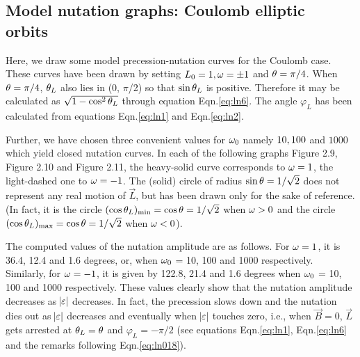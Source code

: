 \subsection{Model nutation graphs: Coulomb elliptic\\ orbits}
\begin{small}
Here, we draw some model precession-nutation  curves for 
the Coulomb case. These curves have been drawn by setting 
$L_{0} = 1, {\omega} = \pm 1$ and ${\theta} = \pi/4$. When ${\theta} = 
\pi/4$, ${\theta}_{L}$ also lies in (0, $\pi$/2) so that $\sin 
{\theta}_{L}$ is positive. Therefore it may be calculated as 
$\sqrt{1-\cos^{2} {\theta}_{L}}$ through equation 
Eqn.\eqref{eq:ln6}. The angle $\varphi_{L}$ has been 
calculated from equations Eqn.\eqref{eq:ln1} and 
Eqn.\eqref{eq:ln2}. 

Further, we have  chosen three convenient values for 
${\omega}_{0}$ namely $ 10,\break 100$ and $ 1000$ which yield closed 
nutation curves. In each of the following graphs
Figure 2.9, Figure 2.10 and Figure 2.11, the 
heavy-solid curve corresponds to ${\omega} = 1$, the 
light-dashed one to ${\omega} = -1$. The (solid) circle of 
radius $\sin {\theta} = 1 / \sqrt{2}$ does not represent any 
real motion of $\vec{L}$, but has been drawn only for the 
sake of reference. (In fact, it is the circle $(\cos 
{\theta}_{L})_{\min} = \cos {\theta} = 1 / \sqrt{2}$ when ${\omega} > 0$ 
and the circle $(\cos {\theta}_{L})_{\max} = \cos {\theta} = 1 / 
\sqrt{2}$ when ${\omega} < 0 $).

The computed values of the nutation amplitude are as 
follows. For ${\omega} = 1$, it is 36.4, 12.4 and 1.6 degrees, 
or, when ${\omega}_{0}$ = 10, 100 and 1000 respectively. 
Similarly, for ${\omega} = -1$, it is given by 122.8, 21.4 and 
1.6 degrees when ${\omega}_{0}$ = 10, 100 and 1000 
respectively. These values clearly show that the nutation 
amplitude decreases as $\abs{\varepsilon}$ decreases. In 
fact, the precession slows down and the nutation dies out as 
$\abs{\varepsilon}$ decreases and eventually when 
$\abs{\varepsilon}$ touches zero, i.e., when $\vec{B} = 0$, 
$\vec{L}$ gets arrested at ${\theta}_{L} = {\theta}$ and 
$\varphi_{L} = -\pi/2$ (see equations Eqn.\eqref{eq:ln1}, 
Eqn.\eqref{eq:ln6} and the remarks following 
Eqn.\eqref{eq:ln018}).
\end{small}

\vspace{-.3cm}

